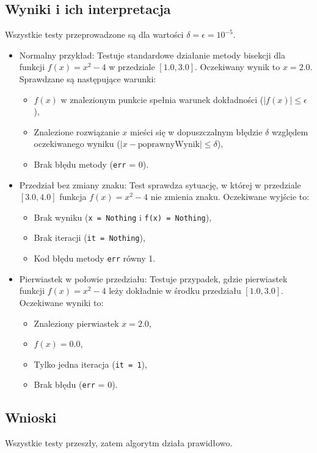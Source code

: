 \documentclass{article}
\begin{document}
\subsection{Wyniki i ich interpretacja}
Wszystkie testy przeprowadzone są dla wartości $\delta = \epsilon = 10^{-5}$.
\begin{itemize}
    \item Normalny przykład:
    Testuje standardowe działanie metody bisekcji dla funkcji \(f(x) = x^2 - 4\) w przedziale \([1.0, 3.0]\). Oczekiwany wynik to \(x = 2.0\). Sprawdzane są następujące warunki:
    \begin{itemize}
        \item \(f(x)\) w znalezionym punkcie spełnia warunek dokładności (\(|f(x)| \leq \epsilon\)),
        \item Znalezione rozwiązanie \(x\) mieści się w dopuszczalnym błędzie \(\delta\) względem oczekiwanego wyniku (\(|x - \text{poprawnyWynik}| \leq \delta\)),
        \item Brak błędu metody (\texttt{err} = 0).
    \end{itemize}
    
    \item Przedział bez zmiany znaku:
    Test sprawdza sytuację, w której w przedziale \([3.0, 4.0]\) funkcja \(f(x) = x^2 - 4\) nie zmienia znaku. Oczekiwane wyjście to:
    \begin{itemize}
        \item Brak wyniku (\texttt{x = Nothing} i \texttt{f(x) = Nothing}),
        \item Brak iteracji (\texttt{it = Nothing}),
        \item Kod błędu metody \texttt{err} równy 1.
    \end{itemize}
    
    \item Pierwiastek w połowie przedziału:
    Testuje przypadek, gdzie pierwiastek funkcji \(f(x) = x^2 - 4\) leży dokładnie w środku przedziału \([1.0, 3.0]\). Oczekiwane wyniki to:
    \begin{itemize}
        \item Znaleziony pierwiastek \(x = 2.0\),
        \item \(f(x) = 0.0\),
        \item Tylko jedna iteracja (\texttt{it = 1}),
        \item Brak błędu (\texttt{err} = 0).
    \end{itemize}
\end{itemize}
\subsection{Wnioski}
Wszystkie testy przeszły, zatem algorytm działa prawidłowo.
\end{document}
